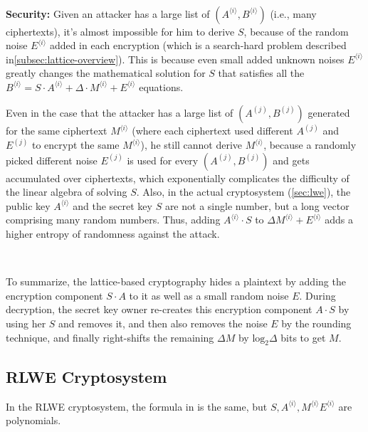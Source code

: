 $ $

\noindent \textbf{Security: } Given an attacker has a large list of $(A^{\langle i \rangle}, B^{\langle i \rangle})$ (i.e., many ciphertexts), it's almost impossible for him to derive $S$, because of the random noise $E^{\langle i \rangle}$ added in each encryption (which is a search-hard problem described in\autoref{subsec:lattice-overview}). This is because even small added unknown noises $E^{\langle i \rangle}$ greatly changes the mathematical solution for $S$ that satisfies all the $B^{\langle i \rangle} = S \cdot A^{\langle i \rangle} + \Delta \cdot M^{\langle i \rangle} + E^{\langle i \rangle}$ equations. 


Even in the case that the attacker has a large list of $(A^{(j)}, B^{(j)})$ generated for the same ciphertext $M^{\langle i \rangle}$ (where each ciphertext used different $A^{(j)}$ and $E^{(j)}$ to encrypt the same $M^{\langle i \rangle}$), he still cannot derive $M^{\langle i \rangle}$, because a randomly picked different noise $E^{(j)}$ is used for every $(A^{(j)}, B^{(j)})$ and gets accumulated over ciphertexts, which exponentially complicates the difficulty of the linear algebra of solving $S$. Also, in the actual cryptosystem (\autoref{sec:lwe}), the public key $A^{\langle i \rangle}$ and the secret key $S$ are not a single number, but a long vector comprising many random numbers. Thus, adding $A^{\langle i \rangle }\cdot S$ to $\Delta M^{\langle i \rangle} + E^{\langle i \rangle}$ adds a higher entropy of randomness against the attack. 

$ $

To summarize, the lattice-based cryptography hides a plaintext by adding the encryption component $S \cdot A$ to it as well as a small random noise $E$. During decryption, the secret key owner re-creates this encryption component $A \cdot S$ by using her $S$ and removes it, and then also removes the noise $E$ by the rounding technique, and finally right-shifts the remaining $\Delta M$ by $\text{log}_2 \Delta$ bits to get $M$.

\subsection{RLWE Cryptosystem}

In the RLWE cryptosystem, the formula in \tboxlabel{\ref*{subsec:lattice-scheme}} is the same, but $S, A^{\langle i \rangle}, M^{\langle i \rangle} E^{\langle i \rangle}$ are polynomials. 